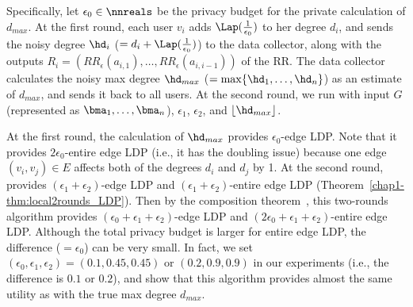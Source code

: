 Specifically, let $\epsilon_0 \in \nnreals$ be the privacy budget for the private calculation of $d_{max}$. 
At the first round, each user $v_i$ adds $\Lap(\frac{1}{\epsilon_0})$ to her degree $d_i$, 
and sends the noisy degree $\hd_i$ ($=d_i + \Lap(\frac{1}{\epsilon_0})$) to the data collector, along with the outputs $R_i = (RR_\epsilon(a_{i,1}), \ldots, RR_\epsilon(a_{i,i-1}))$ of the RR. 
The data collector calculates the noisy max degree $\hd_{max}$ ($= \max\{\hd_1,
\ldots, \hd_n\}$) as an estimate of $d_{max}$, and sends it back to all users. 
At the second round, we run  with input $G$ (represented as $\bma_1, \ldots, \bma_n$), $\epsilon_1$, $\epsilon_2$, and $\lfloor \hd_{max} \rfloor$. 


At the first round, the calculation of $\hd_{max}$ provides $\epsilon_0$-edge LDP. 
Note that it provides $2\epsilon_0$-entire edge LDP (i.e., it has the doubling issue) because one edge $(v_i,v_j) \in E$ affects both of the degrees $d_i$ and $d_j$ by 1. 
At the second round,  provides $(\epsilon_1 + \epsilon_2)$-edge LDP and 
$(\epsilon_1 + \epsilon_2)$-entire edge LDP (Theorem~\ref{chap1-thm:local2rounds_LDP}). 
Then by the composition theorem~\cite{DP}, this two-rounds algorithm provides $(\epsilon_0 + \epsilon_1 + \epsilon_2)$-edge LDP and $(2\epsilon_0 + \epsilon_1 + \epsilon_2)$-entire edge LDP. 
Although the total privacy budget is larger for entire edge LDP, the difference ($=\epsilon_0$) can be very small. 
In fact, we set $(\epsilon_0, \epsilon_1, \epsilon_2) = (0.1, 0.45, 0.45)$ or $(0.2, 0.9, 0.9)$ in our experiments (i.e., the difference is $0.1$ or $0.2$), and show that this algorithm provides almost the same utility as  with the true max degree $d_{max}$. 

